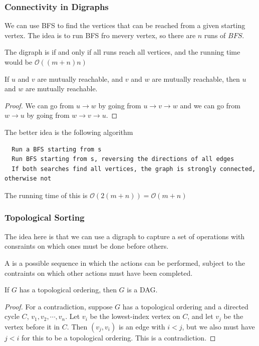 \documentclass[12pt]{scrartcl}
\begin{document}
\subsubsection{Connectivity in Digraphs}

We can use BFS to find the vertices that can be reached from a given starting vertex. The idea 
is to run BFS fro mevery vertex, so there are $n$ runs of $BFS$. 

\begin{note}
  The digraph is  if and only if all runs reach all vertices, and the running time would be 
  $\mathcal{O}((m + n)n)$
\end{note}

\begin{lemma}
  If $u$ and $v$ are mutually reachable, and $v$ and $w$ are mutually reachable, then
  $u$ and $w$ are mutually reachable. 
  \begin{proof}
    We can go from $u \to w$ by going from $u \to v \to w$ and we can go from $w \to u$ by going from 
    $w \to v \to u$. 
  \end{proof} 
\end{lemma}

The better idea is the following algorithm
\begin{lstlisting}
  Run a BFS starting from s
  Run BFS starting from s, reversing the directions of all edges
  If both searches find all vertices, the graph is strongly connected, otherwise not
\end{lstlisting}
The running time of this is $\mathcal{O}(2(m + n)) = \mathcal{O}(m + n)$

\subsubsection{Topological Sorting}

The idea here is that we can use a digraph to capture a set of operations with consraints on which ones must be done 
before others. 

\begin{definition}
  A  is a possible sequence in which the actions can be performed, subject to the contraints on which other actions must have been 
  completed. 
\end{definition}

\begin{lemma}
  If $G$ has a topological ordering, then $G$ is a DAG.
  \begin{proof}
    For a contradiction, suppose $G$ has a topological ordering and a directed cycle $C$, 
    $v_1, v_2, \cdots, v_n$. Let $v_i$ be the lowest-index vertex on $C$, and let $v_j$ be the 
    vertex before it in $C$. Then $(v_j, v_i)$ is an edge with $i < j$, but we also must have $j < i$ for this to be a topological ordering. This 
    is a contradiction. 
  \end{proof}
\end{lemma}
\end{document}

